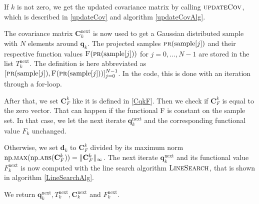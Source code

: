 If $k$ is not zero, we get the updated covariance matrix by calling $\textproc{updateCov}$, which is described in \eqref{updateCov} and algorithm \ref{updateCovAlg}.

The covariance matrix $\mathbf{C}^\mathrm{next}_k$ is now used to get a Gaussian distributed sample with $N$ elements around $\mathbf{q}_k$. The projected samples $\Call{pr}{\mathrm{sample}[j]}$ and their respective function values $\Call{F}{\protect\Call{pr}{\mathrm{sample}[j]}}$ for $j=0,\dotsc,N-1$ are stored in the list $T^\mathrm{next}_k$. The definition is here abbreviated as $[\Call{pr}{\mathrm{sample}[j]},\Call{F}{\protect\Call{pr}{\mathrm{sample}[j]}}]_{j=0}^{N-1}$. In the code, this is done with an iteration through a for-loop.

After that, we set $\mathbf{C}^k_F$ like it is defined in \eqref{CqkF}. Then we check if $\mathbf{C}^k_F$ is equal to the zero vector. That can happen if the functional F is constant on the sample set. In that case, we let the next iterate $\mathbf{q}^\mathrm{next}_k$ and the corresponding functional value $F_k$ unchanged.

Otherwise, we set $\mathbf{d}_k$ to $\mathbf{C}^k_F$ divided by its maximum norm $\mathrm{np.}\Call{max}{\mathrm{np.}\protect\Call{abs}{\mathbf{C}^k_F}}=\|\mathbf{C}^k_F\|_\infty$. The next iterate $\mathbf{q}^\mathrm{next}_{k}$ and its functional value $F^\mathrm{next}_k$ is now computed with the line search algorithm $\textproc{LineSearch}$, that is shown in algorithm \ref{LineSearchAlg}.

We return $\mathbf{q}^\mathrm{next}_k,T^\mathrm{next}_k,\mathbf{C}^\mathrm{next}_k$ and $F^\mathrm{next}_k$.


